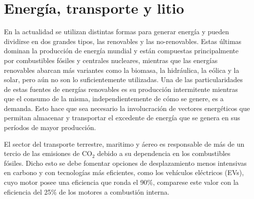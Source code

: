 \section{Energía, transporte y litio}

En la actualidad se utilizan distintas formas para generar energía y pueden 
dividirse en dos grandes tipos, las renovables y las no-renovables. Estas últimas
dominan la producción de energía mundial y están compuestas principalmente por 
combustibles fósiles y centrales nucleares, mientras que las energías renovables
abarcan más variantes como la biomasa, la hidráulica, la eólica y la solar, pero 
aún no son lo suficientemente utilizadas. Una de las particularidades de estas 
fuentes de energías renovables es su producción intermitente mientras que el 
consumo de la misma, independientemente de cómo se genere, es a demanda. Esto 
hace que sea necesario la involucración de vectores energéticos que permitan 
almacenar y transportar el excedente de energía que se genera en sus períodos de 
mayor producción.

El sector del transporte terrestre, maritimo y áereo es responsable de más de un 
tercio de las emisiones de CO$_2$ debido a su dependencia en los combustibles 
fósiles. Dicho esto se debe fomentar opciones de desplazamiento menos intensivas
en carbono y con tecnologías más eficientes, como los vehículos eléctricos (EVs),
cuyo motor posee una eficiencia que ronda el 90\%, comparese este valor con la
eficiencia del 25\% de los motores a combustión interna.

